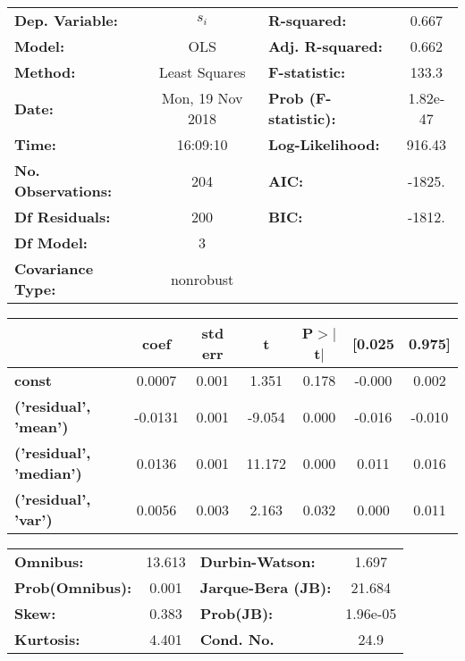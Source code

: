 \begin{center}
\begin{tabular}{lclc}
\toprule
\textbf{Dep. Variable:}    &      $s_i$       & \textbf{  R-squared:         } &    0.667  \\
\textbf{Model:}            &       OLS        & \textbf{  Adj. R-squared:    } &    0.662  \\
\textbf{Method:}           &  Least Squares   & \textbf{  F-statistic:       } &    133.3  \\
\textbf{Date:}             & Mon, 19 Nov 2018 & \textbf{  Prob (F-statistic):} & 1.82e-47  \\
\textbf{Time:}             &     16:09:10     & \textbf{  Log-Likelihood:    } &   916.43  \\
\textbf{No. Observations:} &         204      & \textbf{  AIC:               } &   -1825.  \\
\textbf{Df Residuals:}     &         200      & \textbf{  BIC:               } &   -1812.  \\
\textbf{Df Model:}         &           3      & \textbf{                     } &           \\
\textbf{Covariance Type:}  &    nonrobust     & \textbf{                     } &           \\
\bottomrule
\end{tabular}
\end{center}\begin{center}
\begin{tabular}{lcccccc}
\toprule
                                & \textbf{coef} & \textbf{std err} & \textbf{t} & \textbf{P$>$$|$t$|$} & \textbf{[0.025} & \textbf{0.975]}  \\
\midrule
\textbf{const}                  &       0.0007  &        0.001     &     1.351  &         0.178        &       -0.000    &        0.002     \\
\textbf{('residual', 'mean')}   &      -0.0131  &        0.001     &    -9.054  &         0.000        &       -0.016    &       -0.010     \\
\textbf{('residual', 'median')} &       0.0136  &        0.001     &    11.172  &         0.000        &        0.011    &        0.016     \\
\textbf{('residual', 'var')}    &       0.0056  &        0.003     &     2.163  &         0.032        &        0.000    &        0.011     \\
\bottomrule
\end{tabular}
\end{center}\begin{center}
\begin{tabular}{lclc}
\toprule
\textbf{Omnibus:}       & 13.613 & \textbf{  Durbin-Watson:     } &    1.697  \\
\textbf{Prob(Omnibus):} &  0.001 & \textbf{  Jarque-Bera (JB):  } &   21.684  \\
\textbf{Skew:}          &  0.383 & \textbf{  Prob(JB):          } & 1.96e-05  \\
\textbf{Kurtosis:}      &  4.401 & \textbf{  Cond. No.          } &     24.9  \\
\bottomrule
\end{tabular}
\end{center}